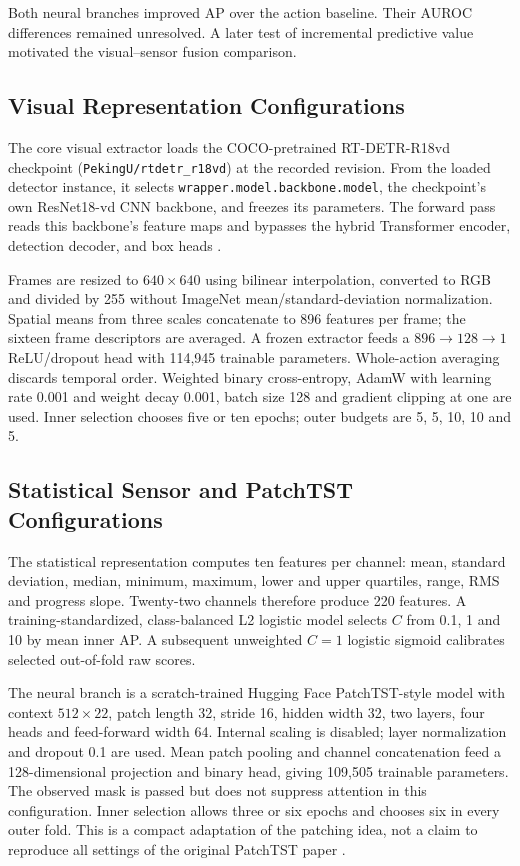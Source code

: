 Both neural branches improved AP over the action baseline. Their AUROC differences remained unresolved. A later test of incremental predictive value motivated the visual--sensor fusion comparison.

\subsection{Visual Representation Configurations}
The core visual extractor loads the COCO-pretrained RT-DETR-R18vd checkpoint (\texttt{PekingU/rtdetr\_r18vd}) at the recorded revision. From the loaded detector instance, it selects \nolinkurl{wrapper.model.backbone.model}, the checkpoint's own ResNet18-vd CNN backbone, and freezes its parameters. The forward pass reads this backbone's feature maps and bypasses the hybrid Transformer encoder, detection decoder, and box heads \parencite{Zhao2024RTDETR}.

Frames are resized to $640\times640$ using bilinear interpolation, converted to RGB and divided by 255 without ImageNet mean/standard-deviation normalization. Spatial means from three scales concatenate to 896 features per frame; the sixteen frame descriptors are averaged. A frozen extractor feeds a $896\rightarrow128\rightarrow1$ ReLU/dropout head with 114,945 trainable parameters. Whole-action averaging discards temporal order. Weighted binary cross-entropy, AdamW with learning rate 0.001 and weight decay 0.001, batch size 128 and gradient clipping at one are used. Inner selection chooses five or ten epochs; outer budgets are 5, 5, 10, 10 and 5.

\subsection{Statistical Sensor and PatchTST Configurations}
The statistical representation computes ten features per channel: mean, standard deviation, median, minimum, maximum, lower and upper quartiles, range, RMS and progress slope. Twenty-two channels therefore produce 220 features. A training-standardized, class-balanced L2 logistic model selects $C$ from 0.1, 1 and 10 by mean inner AP. A subsequent unweighted $C=1$ logistic sigmoid calibrates selected out-of-fold raw scores.

The neural branch is a scratch-trained Hugging Face PatchTST-style model with context $512\times22$, patch length 32, stride 16, hidden width 32, two layers, four heads and feed-forward width 64. Internal scaling is disabled; layer normalization and dropout 0.1 are used. Mean patch pooling and channel concatenation feed a 128-dimensional projection and binary head, giving 109,505 trainable parameters. The observed mask is passed but does not suppress attention in this configuration. Inner selection allows three or six epochs and chooses six in every outer fold. This is a compact adaptation of the patching idea, not a claim to reproduce all settings of the original PatchTST paper \parencite{Nie2023PatchTST}.

